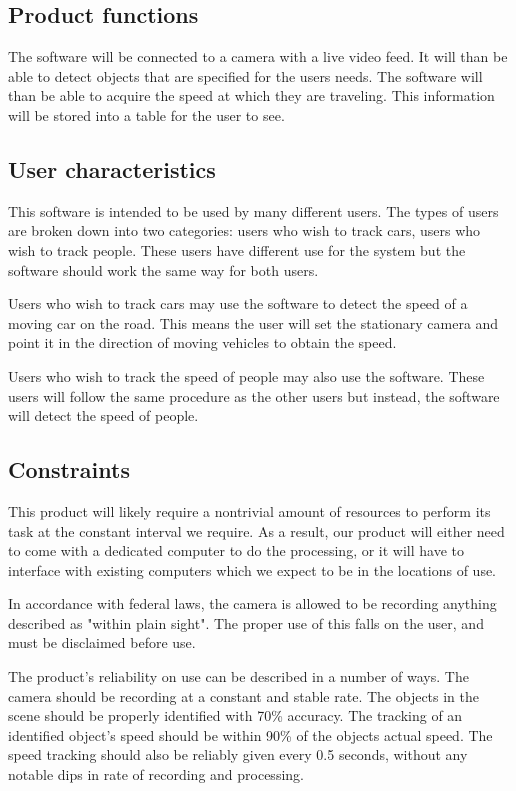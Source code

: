 \documentclass[letterpaper,10pt,onecolumn,draftclsnofoot]{IEEEtran}
\begin{document}
\subsection{Product functions}
The software will be connected to a camera with a live video feed.
It will than be able to detect objects that are specified for the users needs.
The software will than be able to acquire the speed at which they are traveling.
This information will be stored into a table for the user to see.


\subsection{User characteristics}
This software is intended to be used by many different users.
The types of users are broken down into two categories: users who wish to track cars, users who wish to track people.
These users have different use for the system but the software should work the same way for both users.

Users who wish to track cars may use the software to detect the speed of a moving car on the road.
This means the user will set the stationary camera and point it in the direction of moving vehicles to obtain the speed.

Users who wish to track the speed of people may also use the software.
These users will follow the same procedure as the other users but instead, the software will detect the speed of people.

\subsection{Constraints}
This product will likely require a nontrivial amount of resources to perform its task at the constant interval we require.
As a result, our product will either need to come with a dedicated computer to do the processing, or it will have to interface with existing computers which we expect to be in the locations of use.

In accordance with federal laws, the camera is allowed to be recording anything described as "within plain sight".
The proper use of this falls on the user, and must be disclaimed before use.

The product's reliability on use can be described in a number of ways.
The camera should be recording at a constant and stable rate.
The objects in the scene should be properly identified with 70\% accuracy.
The tracking of an identified object's speed should be within 90\% of the objects actual speed.
The speed tracking should also be reliably given every 0.5 seconds, without any notable dips in rate of recording and processing.
\end{document}
